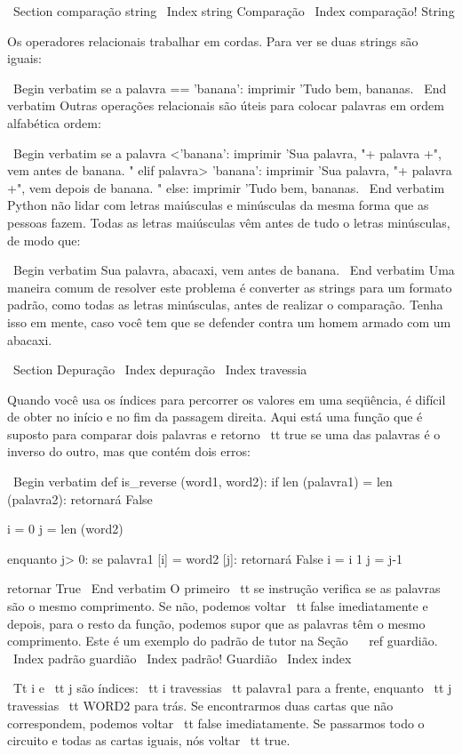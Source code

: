 \documentclass[10pt]{book}
\begin{document}
{{{{{{\ Section {comparação string}
\ Index {string Comparação}
\ Index {comparação! String}

Os operadores relacionais trabalhar em cordas. Para ver se duas strings são iguais:

\ Begin {verbatim}
se a palavra == 'banana':
    imprimir 'Tudo bem, bananas.
\ End {verbatim}
%
Outras operações relacionais são úteis para colocar palavras em ordem alfabética
ordem:

\ Begin {verbatim}
se a palavra <'banana':
    imprimir 'Sua palavra, "+ palavra +", vem antes de banana. "
elif palavra> 'banana':
    imprimir 'Sua palavra, "+ palavra +", vem depois de banana. "
else:
    imprimir 'Tudo bem, bananas.
\ End {verbatim}
%
Python não lidar com letras maiúsculas e minúsculas da mesma forma
que as pessoas fazem. Todas as letras maiúsculas vêm antes de tudo o
letras minúsculas, de modo que:

\ Begin {verbatim}
Sua palavra, abacaxi, vem antes de banana.
\ End {verbatim}
%
Uma maneira comum de resolver este problema é converter as strings para um
formato padrão, como todas as letras minúsculas, antes de realizar o
comparação. Tenha isso em mente, caso você tem que se defender
contra um homem armado com um abacaxi.


\ Section {} Depuração
\ Index {depuração}
\ Index {travessia}

Quando você usa os índices para percorrer os valores em uma seqüência,
é difícil de obter no início e no fim da passagem
direita. Aqui está uma função que é suposto para comparar dois
palavras e retorno {\ tt true} se uma das palavras é o inverso
do outro, mas que contém dois erros:

\ Begin {verbatim}
def is_reverse (word1, word2):
    if len (palavra1) = len (palavra2):
        retornará False
    
    i = 0
    j = len (word2)

    enquanto j> 0:
        se palavra1 [i] = word2 [j]:
            retornará False
        i = i 1
        j = j-1

    retornar True
\ End {verbatim}
%
O primeiro {\ tt se} instrução verifica se as palavras são o
mesmo comprimento. Se não, podemos voltar {\ tt false} imediatamente
e depois, para o resto da função, podemos supor que as palavras
têm o mesmo comprimento. Este é um exemplo do padrão de tutor
na Seção ~ \ ref {} guardião.
\ Index {padrão guardião}
\ Index {padrão! Guardião}
\ Index {index}

{\ Tt i} e {\ tt j} são índices: {\ tt i} travessias {\ tt palavra1}
para a frente, enquanto {\ tt j} travessias {\ tt WORD2} para trás. Se encontrarmos
duas cartas que não correspondem, podemos voltar {\ tt false} imediatamente.
Se passarmos todo o circuito e todas as cartas iguais, nós
voltar {\ tt true}.

}}}}}}
\end{document}
